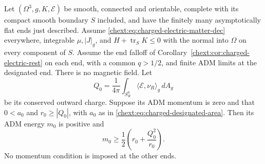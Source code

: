\begin{theorem}
\label{chext:thm:charged-electric-finite-ends}
Let $(\Omega^3,g,K,\mathcal E)$ be smooth, connected and orientable,
complete with its compact smooth boundary $S$ included, and have the
finitely many asymptotically flat ends just described.  Assume
\eqref{chext:eq:charged-electric-matter-dec} everywhere, integrable
$\mu,|J|_g$, and $H+\operatorname{tr}_S K\le0$ with the normal into
$\Omega$ on every component of $S$.  Assume the end falloff of
Corollary~\ref{chext:cor:charged-electric-rest} on each end, with a common
$q>1/2$, and finite ADM limits at the designated end.  There is no
magnetic field.  Let
\[
 Q_0=\frac1{4\pi}\int_{S_R^0}
             \langle\mathcal E,\nu_R\rangle_g\,dA_g
\]
be its conserved outward charge.  Suppose its ADM momentum is zero
and that $0<a_0$ and $r_0\ge|Q_0|$, with $a_0$ as in
\eqref{chext:eq:charged-designated-area}.  Then its ADM energy $m_0$ is
positive and
\begin{equation}\label{chext:eq:charged-finite-ends-bound}
 m_0\ge\frac12\left(r_0+\frac{Q_0^2}{r_0}\right).
\end{equation}
No momentum condition is imposed at the other ends.
\end{theorem}

